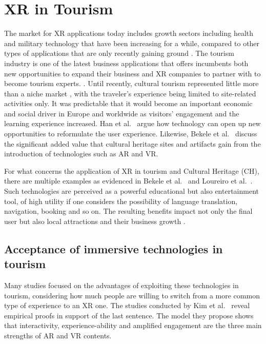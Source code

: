 \section{XR in Tourism}
\label{sec:background-tourism-xr}

The market for XR applications today includes growth sectors including health and military technology that have been increasing for a while, compared to other types of applications that are only recently gaining ground \cite{honkanen_enhancing_2018}. The tourism industry is one of the latest business applications that offers incumbents both new opportunities to expand their business and XR companies to partner with to become tourism experts. \cite{kwok_covid-19_2020}.
Until recently, cultural tourism represented little more than a niche market \cite{han_virtual_2019}, with the traveler's experience being limited to site-related activities only. It was predictable that it would become an important economic and social driver in Europe and worldwide as visitors' engagement and the learning experience increased. Han et al.~\cite{han_virtual_2019} argue how technology can open up new opportunities to reformulate the user experience. Likewise, Bekele et al.~\cite{bekele_survey_2018} discuss the significant added value that cultural heritage sites and artifacts gain from the introduction of technologies such as AR and VR.

For what concerns the application of XR in tourism and Cultural Heritage (CH), there are multiple examples as evidenced in Bekele et al.~\cite{bekele_survey_2018} and Loureiro et al.~\cite{loureiro_20_2020}. Such technologies are perceived as a powerful educational but also entertainment tool, of high utility if one considers the possibility of language translation, navigation, booking and so on. The resulting benefits impact not only the final user but also local attractions and their business growth \cite{nayyar_virtual_2018}. 

\subsection{Acceptance of immersive technologies in tourism}
Many studies focused on the advantages of exploiting these technologies in tourism, considering how much people are willing to switch from a more common type of experience to an XR one.
The studies conducted by Kim et al.~\cite{kim_empirical_2020} reveal empirical proofs in support of the last sentence. The model they propose shows that interactivity, experience-ability and amplified engagement are the three main strengths of AR and VR contents.  


